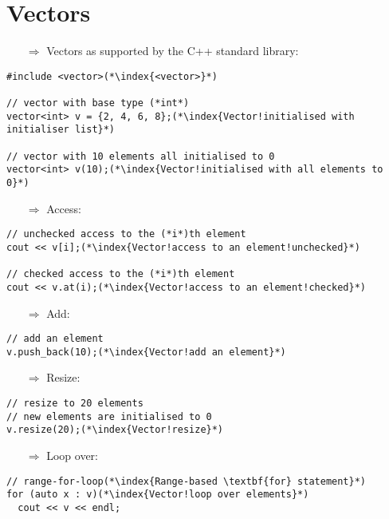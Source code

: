 \documentclass[10pt]{article}
\begin{document}
\section{Vectors}
\small
\begin{enumerate}
\item[$\Rightarrow$] Vectors as supported by the C++ standard library:
\end{enumerate}
\begin{lstlisting}
#include <vector>(*\index{<vector>}*)

// vector with base type (*int*)
vector<int> v = {2, 4, 6, 8};(*\index{Vector!initialised with initialiser list}*)

// vector with 10 elements all initialised to 0
vector<int> v(10);(*\index{Vector!initialised with all elements to 0}*)
\end{lstlisting}
\begin{enumerate}
\item[$\Rightarrow$] Access:
\end{enumerate}
\begin{lstlisting}
// unchecked access to the (*i*)th element
cout << v[i];(*\index{Vector!access to an element!unchecked}*)

// checked access to the (*i*)th element
cout << v.at(i);(*\index{Vector!access to an element!checked}*)
\end{lstlisting}
\begin{enumerate}
\item[$\Rightarrow$] Add:
\end{enumerate}
\begin{lstlisting}
// add an element
v.push_back(10);(*\index{Vector!add an element}*)
\end{lstlisting}
\begin{enumerate}
\item[$\Rightarrow$] Resize:
\end{enumerate}
\begin{lstlisting}
// resize to 20 elements
// new elements are initialised to 0
v.resize(20);(*\index{Vector!resize}*)
\end{lstlisting}
\begin{enumerate}
\item[$\Rightarrow$] Loop over:
\end{enumerate}
\begin{lstlisting}
// range-for-loop(*\index{Range-based \textbf{for} statement}*)
for (auto x : v)(*\index{Vector!loop over elements}*)
  cout << v << endl;\end{lstlisting}
\end{document}
